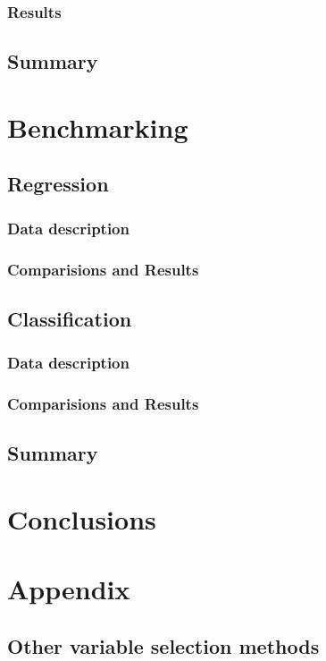 \documentclass[12pt,letterpaper]{article}
\begin{document}
\subsubsection{Results}

\subsection{Summary}
\pagebreak

\section{Benchmarking}

\subsection{Regression}
\subsubsection{Data description}
\subsubsection{Comparisions and Results}
\subsection{Classification}
\subsubsection{Data description}
\subsubsection{Comparisions and Results}

\subsection{Summary}

\pagebreak

\section{Conclusions}
\pagebreak
\section{Appendix}
\subsection{Other variable selection methods}
\end{document}
